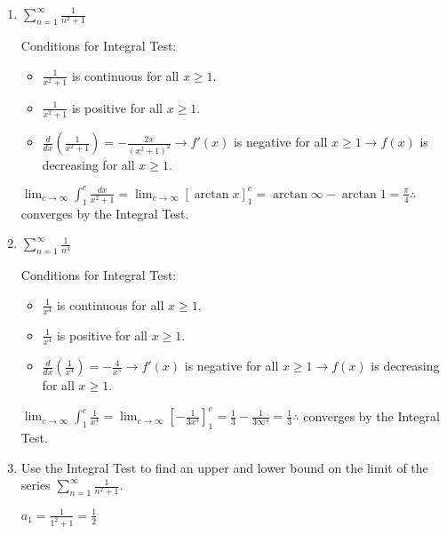 \documentclass[10pt,letterpaper]{report}
\begin{document}
\begin{enumerate}
  \item{$\sum_{n=1}^{\infty}{\frac{1}{n^{2}+1}}$ \\}
  
    Conditions for Integral Test: 
    \begin{itemize}
      \item{$\frac{1}{x^{2}+1}$ is continuous for all $x \geq 1$.}
      \item{$\frac{1}{x^{2}+1}$ is positive for all $x \geq 1$.}
      \item{$\frac{d}{dx}\left(\frac{1}{x^{2}+1}\right) = -\frac{2x}{\left(x^2+1\right)^2} \rightarrow f'(x)$ is negative for all $x \geq 1 \rightarrow f(x)$ is decreasing for all $x \geq 1$. \\}
    \end{itemize}
  
    $\lim_{c\to\infty}\int_{1}^{c}{\frac{dx}{x^{2}+1}} = \lim_{c\to\infty}[\arctan{x}]_{1}^{c} = \arctan{\infty} - \arctan{1} = \frac{\pi}{4} \therefore$ converges by the Integral Test. \\
    
  \item{$\sum_{n=1}^{\infty}{\frac{1}{n^{4}}}$ \\}
  
    Conditions for Integral Test: 
    \begin{itemize}
      \item{$\frac{1}{x^{4}}$ is continuous for all $x \geq 1$.}
      \item{$\frac{1}{x^{4}}$ is positive for all $x \geq 1$.}
      \item{$\frac{d}{dx}\left(\frac{1}{x^{4}}\right) = -\frac{4}{x^5} \rightarrow f'(x)$ is negative for all $x \geq 1 \rightarrow f(x)$ is decreasing for all $x \geq 1$. \\}
    \end{itemize}
  
    $\lim_{c\to\infty}\int_{1}^{c}{\frac{1}{x^{4}}} = \lim_{c\to\infty}\left[-\frac{1}{3x^{3}}\right]_{1}^{c} = \frac{1}{3} - \frac{1}{3\infty^{3}} = \frac{1}{3} \therefore $ converges by the Integral Test. \\
    
  \pagebreak
  
  \item{Use the Integral Test to find an upper and lower bound on the limit of the series $\sum_{n=1}^{\infty}{\frac{1}{n^{2}+1}}$. \\}
  
    $a_{1} = \frac{1}{1^{2} + 1} = \frac{1}{2}$ \\
    

\end{enumerate}
\end{document}
